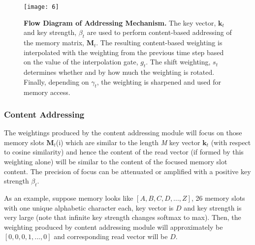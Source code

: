 \begin{figure}[hH]
\centering
\texttt{[image: 6]}
\caption{\textbf{Flow Diagram of Addressing Mechanism.\cite{ntm}} The key vector, $\textbf{k}_t$ and key strength, $\beta_t$ are used to perform content-based addressing of the memory matrix, $\textbf{M}_t$. The resulting content-based weighting is interpolated with the weighting from the previous time step
based on the value of the interpolation gate, $g_t$. The shift weighting, $s_t$ determines whether and by how much the weighting is rotated. Finally, depending on $\gamma_t$, the weighting is sharpened and used for memory access.}
\end{figure}

\subsubsection{Content Addressing}
The weightings produced by the content addressing module will focus on those memory slots $\textbf{M}_t$(i) which are similar to the length \textit{M} key vector $\textbf{k}_t$ (with respect to cosine similarity) and hence the content of the read vector (if formed by this weighting alone) will be similar to the content of the focused memory slot content. The precision of focus can be attenuated or amplified with a positive key strength $\beta_t$.

\noindent As an example, suppose memory looks like ${[A,B,C,D,...,Z]}$, 26 memory slots with one unique alphabetic character each, key vector is ${D}$ and key strength is very large (note that infinite key strength changes softmax to max). Then, the weighting produced by content addressing module will approximately be ${[0,0,0,1,...,0]}$ and corresponding read vector will be ${D}$.

